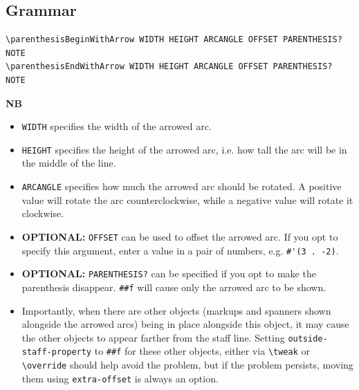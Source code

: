 \subsection{Grammar}
\begin{verbatim}
\parenthesisBeginWithArrow WIDTH HEIGHT ARCANGLE OFFSET PARENTHESIS? NOTE
\parenthesisEndWithArrow WIDTH HEIGHT ARCANGLE OFFSET PARENTHESIS? NOTE
\end{verbatim}
\textbf{NB} \par
\begin{itemize}
\item \verb|WIDTH| specifies the width of the arrowed arc.
\item \verb|HEIGHT| specifies the height of the arrowed arc, i.e. how tall the arc will be in the middle of the line.
\item \verb|ARCANGLE| specifies how much the arrowed arc should be rotated. A positive value will rotate the arc counterclockwise, while a negative value will rotate it clockwise.
\item \textbf{OPTIONAL:} \verb|OFFSET| can be used to offset the arrowed arc. If you opt to specify this argument, enter a value in a pair of numbers, e.g. \verb|#'(3 . -2)|. 
\item \textbf{OPTIONAL:} \verb|PARENTHESIS?| can be specified if you opt to make the parenthesis disappear. \verb|##f| will cause only the arrowed arc to be shown. 
\item Importantly, when there are other objects (markups and spanners shown alongside the arrowed arcs) being in place alongside this object, it may cause the other objects to appear farther from the staff line. Setting \verb|outside-staff-property| to \verb|##f| for these other objects, either via \verb|\tweak| or \verb|\override| should help avoid the problem, but if the problem persists, moving them using \verb|extra-offset| is always an option. 
\end{itemize}


